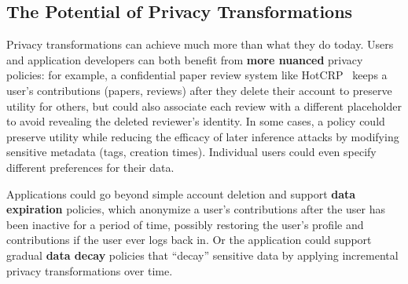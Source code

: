 %
%

\subsection{The Potential of Privacy Transformations}
Privacy transformations can achieve much more than what they do today.
%
Users and application developers can both benefit from \textbf{more nuanced} privacy policies:
%
for example, a confidential paper review system like HotCRP~\cite{hotcrp} keeps a
user's contributions (papers, reviews) after they delete their account to preserve utility for
others, but could also associate each review with a different placeholder to avoid revealing the deleted
reviewer's identity.
%
In some cases, a policy could preserve utility while reducing the efficacy of later inference
attacks by \eg modifying sensitive metadata (\eg tags, creation times).
%
%
%
Individual users could even specify different preferences for their data.
%
%

%
Applications could go beyond simple account deletion and support \textbf{data
expiration} policies, which anonymize a user's contributions after the user has been inactive for a
period of time, possibly restoring the user's profile and contributions if the user ever logs back
in.
%
Or the application could support gradual \textbf{data decay} policies that ``decay'' sensitive data
by applying incremental privacy transformations over time.

